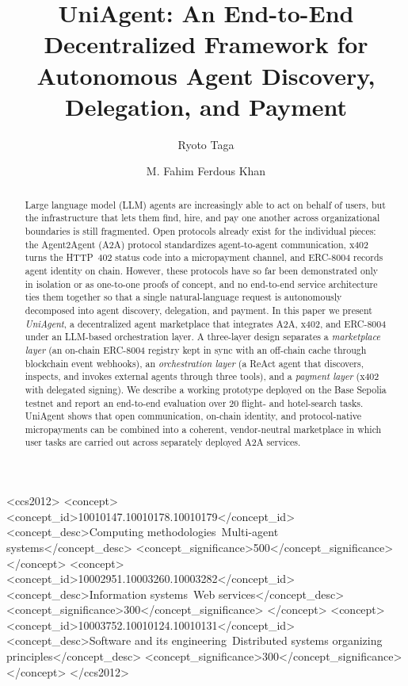 \documentclass[sigconf]{acmart}
\begin{document}
\title[UniAgent: End-to-End Decentralized Agent Framework]{UniAgent: An End-to-End Decentralized Framework for Autonomous Agent Discovery, Delegation, and Payment}

\author{Ryoto Taga}
\author{M. Fahim Ferdous Khan}

\renewcommand{\shortauthors}{Taga and Khan}

\begin{abstract}
  Large language model (LLM) agents are increasingly able to act on
  behalf of users, but the infrastructure that lets them find, hire,
  and pay one another across organizational boundaries is still
  fragmented. Open protocols already exist for the individual pieces:
  the Agent2Agent (A2A) protocol standardizes agent-to-agent
  communication, x402 turns the HTTP~402 status code into a
  micropayment channel, and ERC-8004 records agent identity on chain.
  However, these protocols have so far been demonstrated only in
  isolation or as one-to-one proofs of concept, and no end-to-end
  service architecture ties them together so that a single
  natural-language request is autonomously decomposed into agent
  discovery, delegation, and payment. In this paper we present
  \emph{UniAgent}, a decentralized agent marketplace that integrates
  A2A, x402, and ERC-8004 under an LLM-based orchestration layer. A
  three-layer design separates a \emph{marketplace layer} (an on-chain
  ERC-8004 registry kept in sync with an off-chain cache through
  blockchain event webhooks), an \emph{orchestration layer} (a ReAct
  agent that discovers, inspects, and invokes external agents through
  three tools), and a \emph{payment layer} (x402 with delegated
  signing). We describe a working
  prototype deployed on the Base Sepolia testnet and report an
  end-to-end evaluation over 20 flight- and hotel-search tasks. UniAgent
  shows that open communication, on-chain identity, and
  protocol-native micropayments can be combined into a coherent,
  vendor-neutral marketplace in which user tasks are carried out
  across separately deployed A2A services.
\end{abstract}

\begin{CCSXML}
<ccs2012>
 <concept>
  <concept_id>10010147.10010178.10010179</concept_id>
  <concept_desc>Computing methodologies~Multi-agent systems</concept_desc>
  <concept_significance>500</concept_significance>
 </concept>
 <concept>
  <concept_id>10002951.10003260.10003282</concept_id>
  <concept_desc>Information systems~Web services</concept_desc>
  <concept_significance>300</concept_significance>
 </concept>
 <concept>
  <concept_id>10003752.10010124.10010131</concept_id>
  <concept_desc>Software and its engineering~Distributed systems organizing principles</concept_desc>
  <concept_significance>300</concept_significance>
 </concept>
</ccs2012>
\end{CCSXML}
\end{document}
